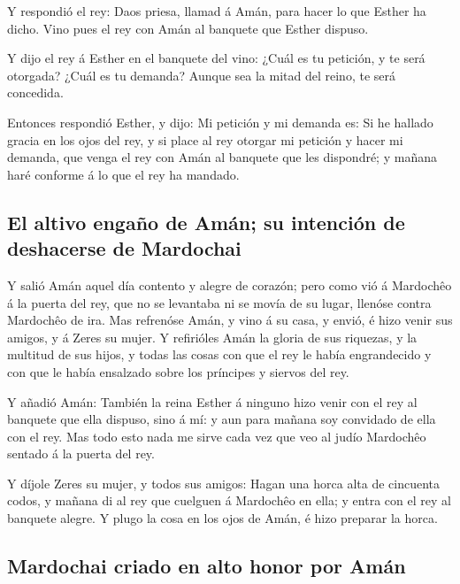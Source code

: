  Y respondió el rey: Daos priesa, llamad á Amán, para
hacer lo que Esther ha dicho. Vino pues el rey con Amán al banquete que
Esther dispuso.

 Y dijo el rey á Esther en el banquete del vino: ¿Cuál es
tu petición, y te será otorgada? ¿Cuál es tu demanda? Aunque sea la
mitad del reino, te será concedida.

 Entonces respondió Esther, y dijo: Mi petición y mi
demanda es:  Si he hallado gracia en los ojos del rey, y
si place al rey otorgar mi petición y hacer mi demanda, que venga el rey
con Amán al banquete que les dispondré; y mañana haré conforme á lo que
el rey ha mandado.

\hypertarget{el-altivo-engauxf1o-de-amuxe1n-su-intenciuxf3n-de-deshacerse-de-mardochai}{%
\subsection{El altivo engaño de Amán; su intención de deshacerse de
Mardochai}\label{el-altivo-engauxf1o-de-amuxe1n-su-intenciuxf3n-de-deshacerse-de-mardochai}}

 Y salió Amán aquel día contento y alegre de corazón; pero
como vió á Mardochêo á la puerta del rey, que no se levantaba ni se
movía de su lugar, llenóse contra Mardochêo de ira.  Mas
refrenóse Amán, y vino á su casa, y envió, é hizo venir sus amigos, y á
Zeres su mujer.  Y refirióles Amán la gloria de sus
riquezas, y la multitud de sus hijos, y todas las cosas con que el rey
le había engrandecido y con que le había ensalzado sobre los príncipes y
siervos del rey.

 Y añadió Amán: También la reina Esther á ninguno hizo
venir con el rey al banquete que ella dispuso, sino á mí: y aun para
mañana soy convidado de ella con el rey.  Mas todo esto
nada me sirve cada vez que veo al judío Mardochêo sentado á la puerta
del rey.

 Y díjole Zeres su mujer, y todos sus amigos: Hagan una
horca alta de cincuenta codos, y mañana di al rey que cuelguen á
Mardochêo en ella; y entra con el rey al banquete alegre. Y plugo la
cosa en los ojos de Amán, é hizo preparar la horca.

\hypertarget{mardochai-criado-en-alto-honor-por-amuxe1n}{%
\subsection{Mardochai criado en alto honor por
Amán}\label{mardochai-criado-en-alto-honor-por-amuxe1n}}

